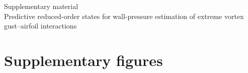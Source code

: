 \documentclass[lineno,paper]{JFM-FLM_Au}
\begin{document}
\nolinenumbers

\begin{center}
{\Large Supplementary material}\\[4pt]
{\large Predictive reduced-order states for wall-pressure estimation of
extreme vortex gust--airfoil interactions}
\end{center}
\vspace{1em}





\section{Supplementary figures}
\label{s:suppfigs}






\end{document}
